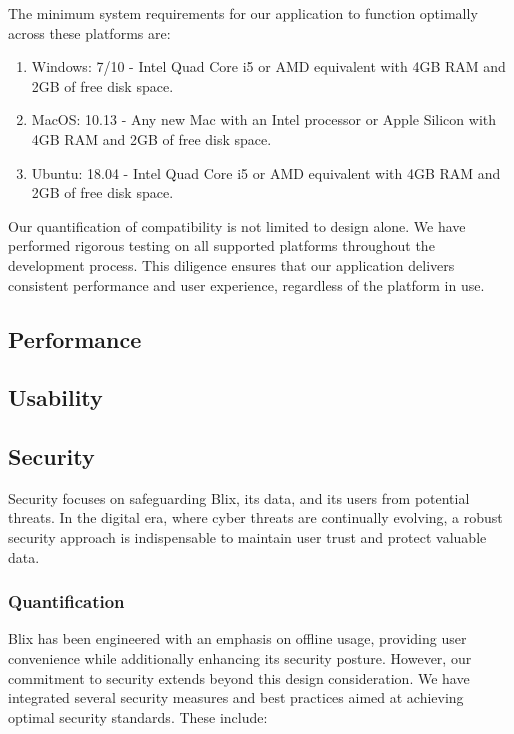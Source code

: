 \documentclass[11pt,a4paper]{article}
\begin{document}
The minimum system requirements for our application to function optimally across
these platforms are:

\begin{enumerate}
  \item Windows: 7/10 - Intel Quad Core i5 or AMD equivalent with 4GB RAM and
  2GB of free disk space.
  \item MacOS: 10.13 - Any new Mac with an Intel processor or Apple Silicon with
  4GB RAM and 2GB of free disk space.
  \item Ubuntu: 18.04 - Intel Quad Core i5 or AMD equivalent with 4GB RAM and
  2GB of free disk space.
\end{enumerate}

Our quantification of compatibility is not limited to design alone. We have
performed rigorous testing on all supported platforms throughout the development
process. This diligence ensures that our application delivers consistent
performance and user experience, regardless of the platform in use.

\subsection*{Performance}

\subsection*{Usability}


\subsection*{Security}

Security focuses on safeguarding Blix, its data, and its users from potential
threats. In the digital era, where cyber threats are continually evolving, a
robust security approach is indispensable to maintain user trust and protect
valuable data.

\subsubsection*{Quantification}

Blix has been engineered with an emphasis on offline usage, providing user
convenience while additionally enhancing its security posture. However, our
commitment to security extends beyond this design consideration. We have
integrated several security measures and best practices aimed at achieving
optimal security standards. These include:
\end{document}

